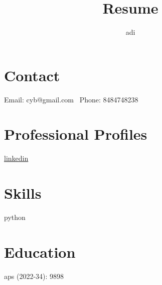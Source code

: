 \documentclass{article}
\begin{document}
    \title{Resume}
    \author{adi}
    \maketitle

    \section*{Contact}
    Email: cyb@gmail.com \
    Phone: 8484748238 \

    \section*{Professional Profiles}
    \href{https://www.linkedin.com/in/gaurav-kumar-dhakad-098782280/}{linkedin}

    \section*{Skills}
    python

    \section*{Education}
    aps (2022-34): 9898
    
    
\end{document}
